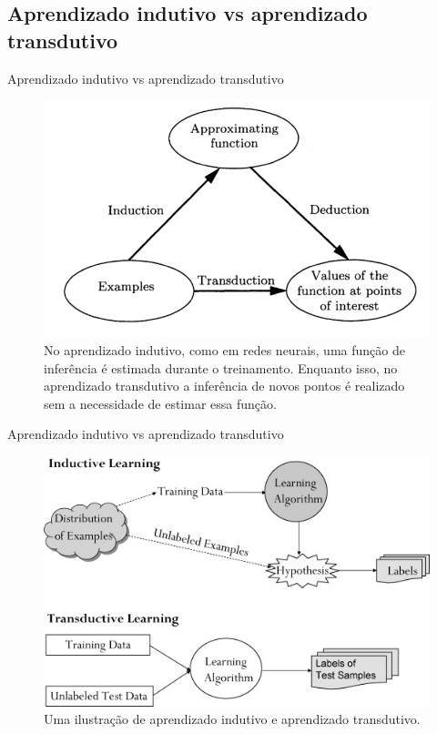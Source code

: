 \documentclass{templatebeamerufc/libs/ufc_format}
\begin{document}
\subsection{Aprendizado indutivo vs aprendizado transdutivo}

\begin{frame}{Aprendizado indutivo vs aprendizado transdutivo}
  \begin{figure}\label{fig:interactive--segmentation}
    \centering
    \caption{
      No aprendizado indutivo, como em redes neurais, uma função de
inferência é estimada durante o treinamento. Enquanto isso,
no aprendizado transdutivo a inferência de novos pontos é realizado sem a
necessidade de estimar essa função.
}
    \includegraphics[scale=0.43]{figuras/induction_vs_transduction_cropped}
  \end{figure}
\end{frame}

\begin{frame}{Aprendizado indutivo vs aprendizado transdutivo}
  \begin{figure}\label{fig:interactive--segmentation} \centering
    \caption{ Uma ilustração de aprendizado indutivo e aprendizado
      transdutivo.  }
    \includegraphics[scale=0.75]{figuras/transductive-vs-inductive}
  \end{figure}
\end{frame}
\end{document}
